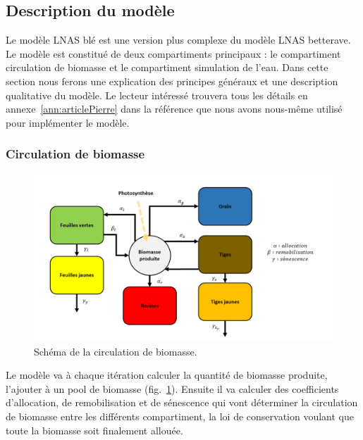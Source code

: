 \subsection{Description du modèle}

Le modèle LNAS blé est une version plus complexe du modèle LNAS betterave. Le modèle est constitué de deux compartiments principaux : le compartiment circulation de biomasse et le compartiment simulation de l'eau. Dans cette section nous ferons une explication des principes généraux et une description qualitative du modèle. Le lecteur intéressé trouvera tous les détails en annexe~\ref{ann:articlePierre} dans  la référence que nous avons nous-même utilisé pour implémenter le modèle.

\subsubsection{Circulation de biomasse}

\begin{figure}[H]

\begin{center}
 \includegraphics[scale = 0.42]{./img/modelSchema.png}
 \caption{Schéma de la circulation de biomasse.}
 \label{fig:schemaModel}
\end{center}

\end{figure}

Le modèle va à chaque itération calculer la quantité de biomasse produite, l'ajouter à un pool de biomasse (fig.~\ref{fig:schemaModel}). Ensuite il va calculer des coefficients d'allocation, de remobilisation et de sénescence qui vont déterminer la circulation de biomasse entre les différents compartiment, la loi de conservation voulant que toute la biomasse soit finalement allouée.

